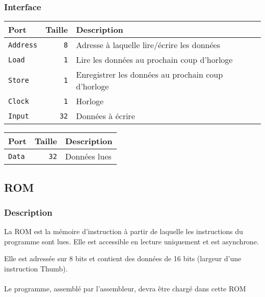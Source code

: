 \subsubsection{Interface}


\begin{tabular}{|l|r|l|}
\hline
\textbf{Port}		& \textbf{Taille} & \textbf{Description}\\
\hline

\texttt{Address}	&  \texttt{8} & Adresse à laquelle lire/écrire les données\\
\hline
\texttt{Load}		&  \texttt{1} & Lire les données au prochain coup d'horloge\\
\hline
\texttt{Store}		&  \texttt{1} & Enregistrer les données au prochain coup d'horloge\\
\hline
\texttt{Clock}		&  \texttt{1} & Horloge\\
\hline
\texttt{Input}		&  \texttt{32} & Données à écrire\\


\hline
\end{tabular}


\begin{tabular}{|l|r|l|}
\hline 
\textbf{Port} & \textbf{Taille} & \textbf{Description}\\
\hline
\texttt{Data}		& \texttt{32} & Données lues\\

\hline
\end{tabular}


\subsection{ROM}

\subsubsection{Description}

La ROM est la mémoire d'instruction à partir de laquelle les instructions du programme sont lues. Elle est accessible en lecture uniquement et est asynchrone.

Elle est adressée sur 8 bits et contient des données de 16 bits (largeur d'une instruction Thumb).

\paragraph{}
Le programme, assemblé par l'assembleur, devra être chargé dans cette ROM

